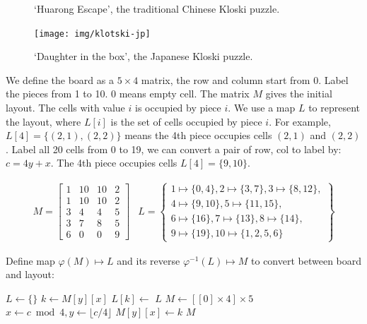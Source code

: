 \documentclass[b5paper]{article}
\begin{document}
\begin{figure}[htbp]
 \centering
  \hspace{.01\textwidth}
 \caption{`Huarong Escape', the traditional Chinese Kloski puzzle.}
 \label{fig:klotski-cn}
\end{figure}

\begin{figure}[htbp]
 \centering
 \texttt{[image: img/klotski-jp]}
 \caption{`Daughter in the box', the Japanese Kloski puzzle.}
 \label{fig:klotski-jp}
\end{figure}

We define the board as a $5 \times 4$ matrix, the row and column start from 0. Label the pieces from 1 to 10. 0 means empty cell. The matrix $M$ gives the initial layout. The cells with value $i$ is occupied by piece $i$. We use a map $L$ to represent the layout, where $L[i]$ is the set of cells occupied by piece $i$. For example, $L[4] = \{(2, 1), (2, 2)\}$ means the 4th piece occupies cells $(2, 1)$ and $(2, 2)$. Label all 20 cells from 0 to 19, we can convert a pair of row, col to label by: $c = 4y + x$. The 4th piece occupies cells $L[4] = \{9, 10\}$.

\[
\begin{array}{cc}
M = \left [
  \begin{array}{cccc}
  1 & 10 & 10 & 2 \\
  1 & 10 & 10 & 2 \\
  3 & 4 & 4 & 5 \\
  3 & 7 & 8 & 5 \\
  6 & 0 & 0 & 9
  \end{array}
\right ] &
L = \left \{
  \begin{array}{l}
  1 \mapsto \{0, 4\}, 2 \mapsto \{3, 7\}, 3 \mapsto \{8, 12\}, \\
  4 \mapsto \{9, 10\}, 5 \mapsto \{11, 15\}, \\
  6 \mapsto \{16\}, 7 \mapsto \{ 13 \}, 8 \mapsto \{ 14 \}, \\
  9 \mapsto \{ 19 \}, 10 \mapsto \{1, 2, 5, 6\}
  \end{array}
\right \}
\end{array}
\]

Define map $\varphi(M) \mapsto L$ and its reverse $\varphi^{-1}(L) \mapsto M$ to convert between board and layout:

\begin{algorithmic}[1]
  \State $L \gets \{ \}$
      \State $k \gets M[y][x]$
      \State $L[k] \gets$ 
    \EndFor
  \EndFor
  \State \Return $L$
\EndFunction
\Statex
{}
  \State $M \gets [[0] \times 4] \times 5$
      \State $x \gets c \bmod 4, y \gets \lfloor c / 4\rfloor$
      \State $M[y][x] \gets k$
    \EndFor
  \EndFor
  \State \Return $M$
\EndFunction
\end{algorithmic}
\end{document}
